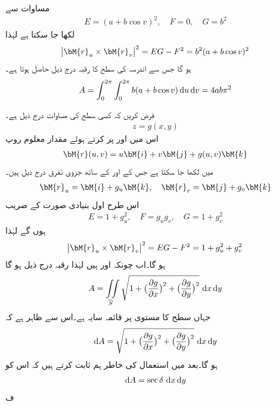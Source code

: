مساوات  سے
\begin{align*}
E=(a+b\cos v)^2,\quad F=0,\quad G=b^2
\end{align*}
لکھا جا سکتا ہے لہٰذا
\begin{align*}
\abs{\bM{r}_u\times \bM{r}_v}^2=EG-F^2=b^2(a+b\cos v)^2
\end{align*}
ہو گا جس سے اندرسہ کی سطح کا رقبہ درج ذیل حاصل ہوتا ہے۔
\begin{align*}
A=\int_{0}^{2\pi}\int_0^{2\pi}b(a+b\cos v)\dif u\dif v=4ab\pi^2
\end{align*}

فرض کریں کہ کسی سطح کی مساوات درج ذیل ہے۔
\begin{align}
z=g(x,y)
\end{align}
اس میں  اور  پر کرتے ہوئے مقدار معلوم روپ
\begin{align}
\bM{r}(u,v)=u\bM{i}+v\bM{j}+g(u,v)\bM{k}
\end{align}
میں لکھا جا سکتا ہے جس کے  اور  کے ساتھ جزوی تفرق درج ذیل ہیں۔
\begin{align}\label{مساوات_خطی_تکمل_جزوی_تفرقات_الف}
\bM{r}_u=\bM{i}+g_u\bM{k},\quad \bM{r}_v=\bM{j}+g_v\bM{k}
\end{align}
اس طرح اول بنیادی صورت کے  ضریب 
\begin{align*}
E=1+g_u^2,\quad F=g_ug_v,\quad G=1+g_v^2
\end{align*}
ہوں گے لہٰذا
\begin{align*}
\abs{\bM{r}_u\times \bM{r}_v}^2=EG-F^2=1+g_u^2+g_v^2
\end{align*}
ہو گا۔اب چونکہ  اور  ہیں  لہٰذا رقبہ درج ذیل ہو گا
\begin{align}\label{مساوات_خطی_تکمل_صریح_تفاعل_رقبہ_الف}
A=\iint\limits_{\overline{S}} \sqrt{1+\big(\frac{\partial g}{\partial x}\big)^2+\big(\frac{\partial g}{\partial y}\big)^2}\,\dif x\dif y
\end{align}
جہاں سطح  کا  مستوی   پر  قائمہ سایہ  ہے۔اس سے ظاہر ہے کہ
\begin{align}\label{مساوات_خطی_تکمل_صریح_تفاعل_رقبہ_ب}
\dif A=\sqrt{1+\big(\frac{\partial g}{\partial x}\big)^2+\big(\frac{\partial g}{\partial y}\big)^2}\,\dif x\dif y
\end{align}
ہو گا۔بعد میں استعمال کی خاطر ہم ثابت کرتے ہیں کہ اس کو
\begin{align}\label{مساوات_خطی_تکمل_صریح_تفاعل_رقبہ_پ}
\dif A=\sec \delta \, \dif x\dif y
\end{align}ف
